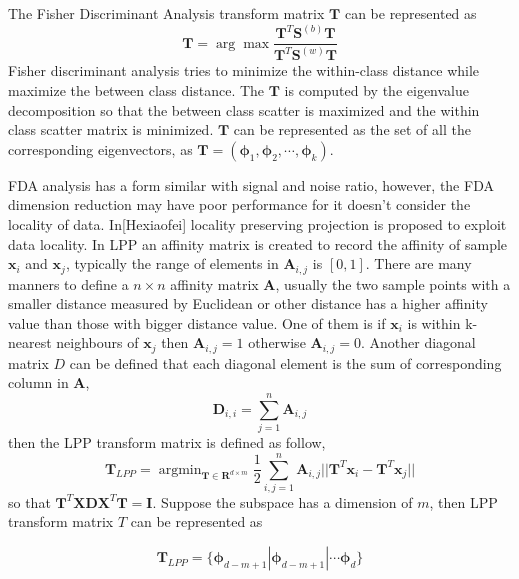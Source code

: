 \documentclass[conference,compsoc]{IEEEtran}
\begin{document}
The Fisher Discriminant Analysis transform matrix $\bm{T}$ can be represented as 
\begin{equation}
\bm{T} = \arg\max \frac{\bm{T}^T\bm{S}^{(b)}\bm{T}}{\bm{T}^T\bm{S}^{(w)}\bm{T}}
\end{equation}
Fisher discriminant analysis tries to minimize the within-class distance while maximize the between class distance. The $\bm{T}$ is computed by the eigenvalue decomposition so that the between class scatter is maximized and the within class scatter matrix is minimized. $\bm{T}$ can be represented as the set of all the corresponding eigenvectors, as $ \bm{T} = (\bm{\phi}_1,\bm{\phi}_2,\cdots,\bm{\phi}_k)$.

FDA analysis has a form similar with signal and noise ratio, however, the FDA dimension reduction may have poor performance for it doesn't consider the locality of data. In[Hexiaofei] locality preserving projection is proposed to exploit data locality. In LPP an affinity matrix is created to record the affinity of sample $\bm{x}_i$ and $\bm{x}_j$,  typically the range of elements in $\bm{A}_{i,j}$ is $[0,1]$. There are many manners to define a $n \times n$ affinity matrix $\bm{A}$, usually the two sample points with a smaller distance measured by Euclidean or other distance has a higher affinity value than those with bigger distance value. One of them is if  $\bm{x}_i$ is within k-nearest neighbours of $\bm{x}_j$ then $\bm{A}_{i,j} = 1$ otherwise  $\bm{A}_{i,j} = 0$.  Another diagonal matrix $D$ can be defined that each diagonal element is the sum of corresponding column in $\bm{A}$,
\begin{equation}
\bm{D}_{i,i} = \mathop{\sum}_{j=1}^n \bm{A}_{i, j} 
\end{equation}
then the LPP transform matrix is defined as follow,
\begin{equation}
\bm{T}_{LPP} = \mathop{\arg\min}_{\bm{T}\in\bm{R}^{d\times m}} \frac{1}{2}\mathop{\sum}_{i, j= 1}^n \bm{A}_{i,j} ||\bm{T}^T\bm{x}_i - \bm{T}^T\bm{x}_j||
\end{equation}
so that $ \bm{T}^T\bm{X}\bm{D}\bm{X}^T\bm{T} = \bm{I} $.
Suppose the subspace has a dimension of $m$, then LPP transform matrix $T$ can be represented as 

$$\bm{T}_{LPP} = \{ \bm{\phi}_{d-m+1} | \bm{\phi}_{d-m+1} | \cdots \bm{\phi}_{d}\} $$
\end{document}
